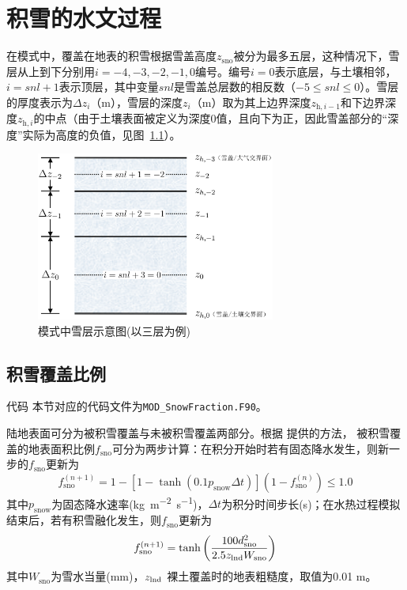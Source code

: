 \chapter{积雪的水文过程}
在模式中，覆盖在地表的积雪根据雪盖高度$z_{\mathrm{sno}}$被分为最多五层，这种情况下，雪层从上到下分别用$i = −4, −3, −2, −1, 0$编号。编号$i = 0$表示底层，与土壤相邻，$i = snl + 1$表示顶层，其中变量$snl$是雪盖总层数的相反数（$-5\leqslant snl\leqslant 0$）。雪层的厚度表示为$\Delta z_i$（m），雪层的深度$z_i$（m）取为其上边界深度$z_{\mathrm{h},i-1}$和下边界深度$z_{\mathrm{h},i}$的中点（由于土壤表面被定义为深度0值，且向下为正，因此雪盖部分的“深度”实际为高度的负值，见图~\ref{fig:模式中积雪雪层示意图}）。
{
  \begin{figure}[htbp]
    \centering
    \includegraphics[width=0.7\textwidth]{Figures/雪盖土壤热力过程/模式中积雪雪层示意图.png}
    \caption{模式中雪层示意图(以三层为例)}
    \label{fig:模式中积雪雪层示意图}
  \end{figure}
}
\section{积雪覆盖比例}
\begin{mymdframed}{代码}
  本节对应的代码文件为\texttt{MOD\_SnowFraction.F90}。
\end{mymdframed}

陆地表面可分为被积雪覆盖与未被积雪覆盖两部分。根据 \citet{swenson2012new}提供的方法，
被积雪覆盖的地表面积比例$f_{\mathrm{sno}}$可分为两步计算：在积分开始时若有固态降水发生，则新一步的$f_{\mathrm{sno}}$更新为
\begin{equation}
  f_{\mathrm{{sno }}}^{(n+1)}=1-\left[1-\tanh\left(0.1 p_{\mathrm{snow}} \Delta t\right)\right]\left(1-f_{\mathrm{{sno }}}^{(n)}\right) \leqslant 1.0
\end{equation}
其中$p_{\mathrm {snow}} $为固态降水速率(\unit{kg.m^{-2}.s^{-1}})，$\Delta t$为积分时间步长(s)；在水热过程模拟结束后，若有积雪融化发生，则$f_{\mathrm{sno}}$更新为
\begin{equation}
  f_{\mathrm{sno}}^{(n+1)}=\tanh{\left(\frac{100 d_{\mathrm{s n o}}^{2}}{2.5 z_{\rm lnd} W_{\mathrm{sno}}}\right)}
\end{equation}
其中$W_{\mathrm{sno}}$为雪水当量(mm)，$z_{\rm lnd}$ 裸土覆盖时的地表粗糙度，取值为0.01 m。


